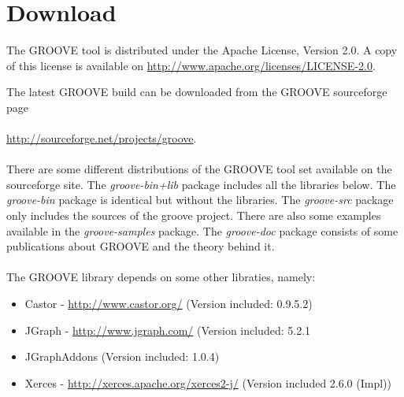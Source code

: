 \section{Download}

The GROOVE tool is distributed under the Apache License, Version 2.0. A copy of this license is available on 
\url{http://www.apache.org/licenses/LICENSE-2.0}.

\bigskip

The latest GROOVE build can be downloaded from the GROOVE sourceforge page\\
\\
\url{http://sourceforge.net/projects/groove}.\\
\\
There are some different distributions of the GROOVE tool set available on the sourceforge site. The \emph{groove-bin+lib} package includes all the libraries below. The \emph{groove-bin} package is identical but without the libraries. The \emph{groove-src} package only includes the sources of the groove project. There are also some examples available in the \emph{groove-samples} package. The \emph{groove-doc} package consists of some publications about GROOVE and the theory behind it. 
\\\\
The GROOVE library depends on some other libraties, namely:

\begin{itemize}
\item Castor - \url{http://www.castor.org/} (Version included: 0.9.5.2)
\item JGraph - \url{http://www.jgraph.com/} (Version included: 5.2.1 
\item JGraphAddons (Version included: 1.0.4)
\item Xerces - \url{http://xerces.apache.org/xerces2-j/} (Version included 2.6.0 (Impl))
\end{itemize}




